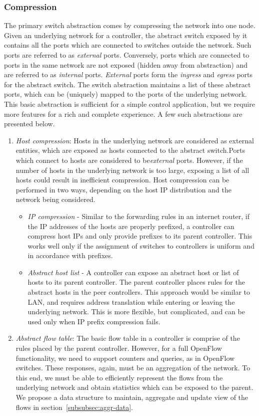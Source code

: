 \documentclass[10pt, twocolumn]{article}
\begin{document}
\subsubsection{Compression}
The primary switch abstraction comes by compressing the network into one node. Given an underlying network for a controller, the abstract switch exposed by it contains all the ports which are connected to switches outside the network. Such ports are referred to as \emph{external} ports. Conversely, ports which are connected to ports in the same network are not exposed (hidden away from abstraction) and are referred to as \emph{internal} ports. \emph{External} ports form the \emph{ingress} and \emph{egress} ports for the abstract switch. The switch abstraction maintains a list of these abstract ports, which can be (uniquely) mapped to the ports of the underlying network. This basic abstraction is sufficient for a simple control application, but we require more features for a rich and complete experience. A few such abstractions are presented below.
\begin{enumerate}
    \item \emph{Host compression}:
    Hosts in the underlying network are considered as external entities, which are exposed as hosts connected to the abstract switch.Ports which connect to hosts are considered to be\emph{external} ports. However, if the number of hosts in the underlying network is too large, exposing a list of all hosts could result in inefficient compression. Host compression can be performed in two ways, depending on the host IP distribution and the network being considered.
    \begin{itemize}
        \item \emph{IP compression} -
        Similar to the forwarding rules in an internet router, if the IP addresses of the hosts are properly prefixed, a controller can compress host IPs and only provide prefixes to its parent controller. This works well only if the assignment of switches to controllers is uniform and in accordance with prefixes.
        \item \emph{Abstract host list} -
        A controller can expose an abstract host or list of hosts to its parent controller. The parent controller places rules for the abstract hosts in the peer controllers. This approach would be similar to LAN, and requires address translation while entering or leaving the underlying network. This is more flexible, but complicated, and can be used only when IP prefix compression fails.
    \end{itemize}
    \item \emph{Abstract flow table}:
        The basic flow table in a controller is comprise of the rules placed by the parent controller. However, for a full OpenFlow functionality, we need to support counters and queries, as in OpenFlow switches. These responses, again, must be an aggregation of the network. To this end, we must be able to efficiently represent the flows from the underlying network and obtain statistics which can be exposed to the parent. We propose a data structure to maintain, aggregate and update view of the flows in section~\ref{subsubsec:aggr-data}.
\end{enumerate}
\end{document}
